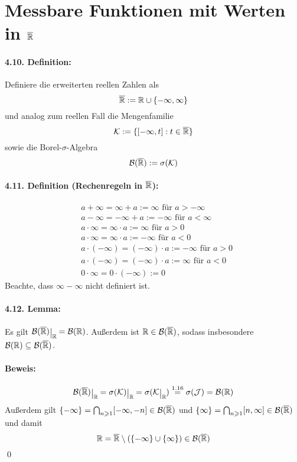 \documentclass[12pt]{report}
\begin{document}
  \section*{Messbare Funktionen mit Werten in $\overline{\mathbb{R}}$}
  
  
  \paragraph{4.10. Definition:}Definiere die erweiterten reellen Zahlen als
  $$\overline{\mathbb{R}}:=\mathbb{R}\cup\{-\infty,\infty\}$$
  und analog zum reellen Fall die Mengenfamilie
  $$\mathcal{K}:=\{[-\infty,t]:t\in\overline{\mathbb{R}}\}$$
  sowie die Borel-$\sigma$-Algebra
  $$\mathcal{B}(\overline{\mathbb{R}}):=\sigma(\mathcal{K})$$
  
  \paragraph{4.11. Definition (Rechenregeln in $\overline{\mathbb{R}}$):}
  \begin{align*}
      &a+\infty=\infty+a:=\infty\text{ f\"ur }a>-\infty\\
      &a-\infty=-\infty+a:=-\infty\text{ f\"ur }a<\infty\\
      &a\cdot\infty=\infty\cdot a:=\infty\text{ f\"ur }a>0\\
      &a\cdot\infty=\infty\cdot a:=-\infty\text{ f\"ur }a<0\\
      &a\cdot(-\infty)=(-\infty)\cdot a:=-\infty\text{ f\"ur }a>0\\
      &a\cdot(-\infty)=(-\infty)\cdot a:=\infty\text{ f\"ur }a<0\\
      &0\cdot\infty=0\cdot(-\infty):=0
  \end{align*}
  Beachte, dass $\infty-\infty$ nicht definiert ist.
  
  \paragraph{4.12. Lemma:} Es gilt $\cB(\overline\R)\krestr{\R}=\borel$. Au\ss{}erdem ist $\mathbb{R}\in\mathcal{B}(\overline{\mathbb{R}})$, sodass insbesondere $\mathcal{B}(\mathbb{R})\subseteq\mathcal{B}(\overline{\mathbb{R}})$.
 
 \paragraph{Beweis:}
 $$\cB(\overline\R)\krestr{\R}=\sigma(\mathcal{K})\krestr{\R}=\sigma(\mathcal{K}\krestr{\R})\overset{1.16}{=}\sigma(\mathcal{J})=\borel$$
 Au\ss{}erdem gilt $\{-\infty\}=\bigcap_{n\geqslant1}[-\infty,-n]\in\mathcal{B}(\overline{\mathbb{R}})$ und $\{\infty\}=\bigcap_{n\geqslant1}[n,\infty]\in\mathcal{B}(\overline{\mathbb{R}})$ und damit 
 $$\mathbb{R}=\overline{\mathbb{R}}\setminus(\{-\infty\}\cup\{\infty\})\in\mathcal{B}(\overline{\mathbb{R}})$$
 \qed
 
\end{document}
